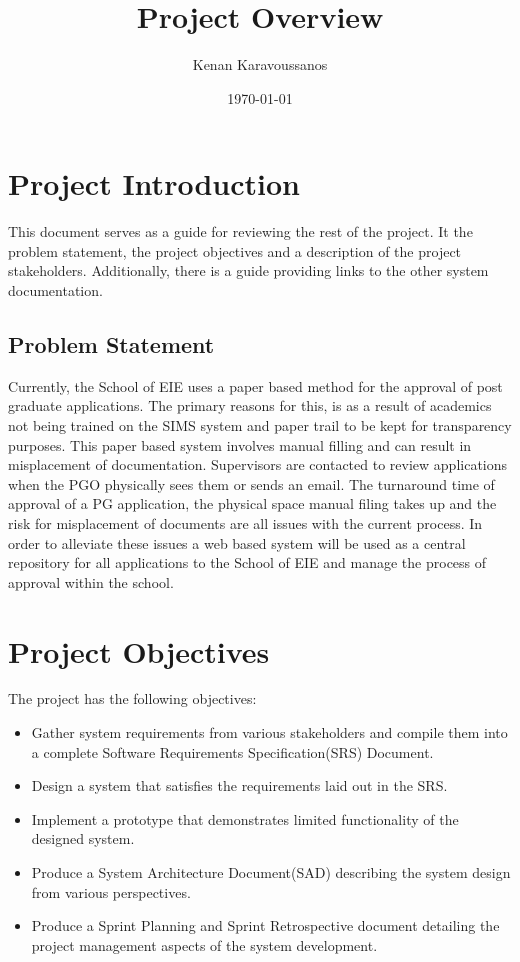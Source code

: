 \documentclass[11pt]{article}
\title{Project Overview}
\author{ Kenan Karavoussanos}
\date{\today}
\begin{document}
\maketitle
\section{Project Introduction}
This document serves as a guide for reviewing the rest of the project. It the problem statement, the project objectives and a description of the project stakeholders. Additionally, there is a guide providing links to the other system documentation.

\subsection{Problem Statement}
Currently, the School of EIE uses a paper based method for the approval of post graduate applications. The primary reasons for this, is as a result of academics not being trained on the SIMS system and paper trail to be kept for transparency purposes. This paper based system involves manual filling and can result in misplacement of documentation. Supervisors are contacted to review applications when the PGO physically sees them or sends an email. The turnaround time of approval of a PG application, the physical space manual filing takes up and the risk for misplacement of documents are all issues with the current process. In order to alleviate these issues a web based system will be used as a central repository for all applications to the School of EIE and manage the process of approval within the school.

\section{Project Objectives}
The project has the following objectives:
\begin{itemize}
	\item Gather system requirements from various stakeholders and compile them into a complete Software Requirements Specification(SRS) Document.
	\item Design a system that satisfies the requirements laid out in the SRS.
	\item Implement a prototype that demonstrates limited functionality of the designed system.
	\item Produce a System Architecture Document(SAD) describing the system design from various perspectives.
	\item Produce a Sprint Planning and Sprint Retrospective document detailing the project management aspects of the system development.
\end{itemize}
\end{document}
